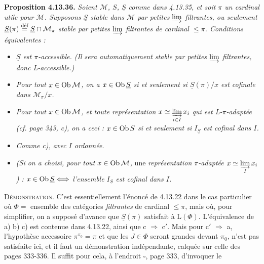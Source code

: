 \textbf{Proposition 4.13.36.} \textit{Soient $\mathcal{M}$, $S$, $\underline{S}$ comme dans 4.13.35, et soit $\pi$ un cardinal utile pour $\mathcal{M}$. Supposons $\underline{S}$ stable dans $\mathcal{M}$ par petites $\limind$ filtrantes, ou seulement $\underline{S}(\pi) \defeq \underline{S} \cap \mathcal{M}_\pi$ stable par petites $\limind$ filtrantes de cardinal $\leqslant \pi$. Conditions équivalentes :}
\begin{itemize}[leftmargin=2.5em]
\item[\textit{a)}] \textit{$\underline{S}$ est $\pi$-accessible. (Il sera automatiquement stable par petites $\limind$ filtrantes, donc L-accessible.)}
\item[\textit{b)}] \textit{Pour tout $x \in \Ob \mathcal{M}$, on a $x \in \Ob \underline{S}$ si et seulement si $\underline{S}(\pi)/x$ est cofinale dans $\mathcal{M}_\pi/x$.}
\item[\textit{c)}] \textit{Pour tout $x \in \Ob \mathcal{M}$, et toute représentation $x \simeq \varinjlim\limits_{i\in I} x_i$}
\textit{qui est L-$\pi$-adaptée (cf. page 343, c), on a ceci : $x \in \Ob S$ si et seulement si $I_{\underline{S}}$ est cofinal dans $I$.}
\item[\textit{c}$'$\textit{)}] \textit{Comme c), avec $I$ ordonnée.}
\item[\textit{c}$''$\textit{)}] \textit{(Si on a choisi, pour tout $x \in \Ob \mathcal{M}$,} une \textit{représentation $\pi$-adaptée $x \simeq \varinjlim\limits_{I} x_i$) : $x \in \Ob \underline{S} \Longleftrightarrow$ l'ensemble $I_{\underline{S}}$ est cofinal dans $I$.}
\end{itemize}
\textsc{Démonstration}. C'est essentiellement l'énoncé de 4.13.22 dans le cas particulier où $\Phi =$ ensemble des catégories \textit{filtrantes} de cardinal $\leqslant \pi$, mais où, pour simplifier, on a supposé d'avance que $\underline{S}(\pi)$ satisfait à $\mathrm{L}(\Phi)$. L'équivalence de a) b) c) est contenue dans 4.13.22, ainsi que c $\Longrightarrow$ c$'$. Mais pour c$'$ $\Longrightarrow$ a, l'hypothèse accessoire $\pi^{\pi_0} = \pi$ et que les $J \in \Phi$ seront grandes devant $\pi_0$, n'est pas satisfaite ici, et il faut un démonstration indépendante, calquée sur celle des pages 333-336. Il suffit pour cela, à l'endroit $\square$, page 333, d'invoquer le %

